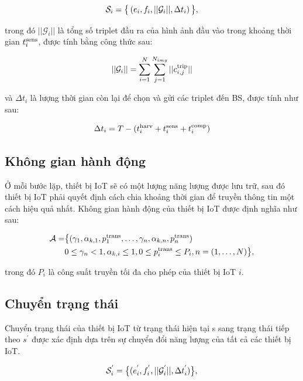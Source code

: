 \documentclass{article} %
\begin{document}
\begin{equation}
\label{c_2}
    \mathcal{S}_i=\big{\{} \left ( e_i, f_i, ||\mathcal{G}_{i}||, \Delta t_i \right )\big{\}}, 
\end{equation}

trong đó $||\mathcal{G}_{i}||$ là tổng số triplet đầu ra của hình ảnh đầu vào trong khoảng thời gian $t_i^{\rm{sens}}$, được tính bằng công thức sau:

\begin{equation}
\label{c_3}
||\mathcal{G}_{i}|| = \sum_{i=1}^{N}\sum_{j=1}^{N_{img}} ||c^{\rm{trip}}_{i,j}||
\end{equation}

và $\Delta t_i$  là lượng thời gian còn lại để chọn và gửi các triplet đến BS, được tính như sau:

\begin{equation}
\label{c_4}
\Delta t_i = T - (t^{\rm{harv}}_i + t^{\rm{sens}}_i + t^{\rm{comp}}_i )
\end{equation}

\subsection{Không gian hành động}
Ở mỗi bước lặp, thiết bị IoT sẽ có một lượng năng lượng được lưu trữ, sau đó thiết bị IoT phải quyết định cách chia khoảng thời gian để truyền thông tin một cách hiệu quả nhất. Không gian hành động của thiết bị IoT được định nghĩa như sau:

\begin{align}
    \mathcal{A} =&\big{\{}( {\gamma}_{1},{\alpha}_{k, 1}, p_1^{\rm{trans}}, \ldots,  {\gamma}_{n},{\alpha}_{k, n}, p_n^{\rm{trans}})\\
    & 0 \leq {\gamma}_{n} < 1,  {\alpha}_{k, i} \leq 1,0 \leq p_i^{\rm{trans}} \leq P_i,n =(1,\ldots,N) \big{\}},
    \notag
\end{align}

trong đó $P_i$ là công suất truyền tối đa cho phép của thiết bị IoT $i$.

\subsection{Chuyển trạng thái}

Chuyển trạng thái của thiết bị IoT từ trạng thái hiện tại s sang trạng thái tiếp theo $s^\prime$ được xác định dựa trên sự chuyển đổi năng lượng của tất cả các thiết bị IoT.

\begin{equation}
    \mathcal{S}^{'}_i=\big{\{}  ( e_i^{'}, f_i^{'},||\mathcal{G}_{i}^{'}||, \Delta t_i^{'}  )\big{\}}, 
\end{equation}
\end{document}
